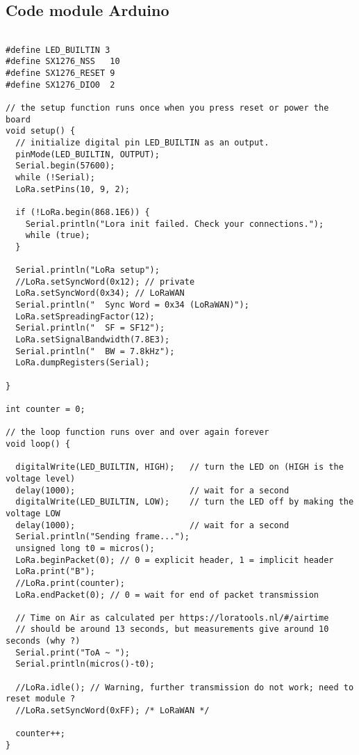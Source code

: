 \renewcommand{\leftmark}{ANNEXES}

\chapter{}

\section{Code module Arduino}\label{codearduino}

\begin{lstlisting}[style=cppstyle, caption={Module Arduino}, label={lst:cpp}]

#define LED_BUILTIN 3
#define SX1276_NSS   10
#define SX1276_RESET 9
#define SX1276_DIO0  2

// the setup function runs once when you press reset or power the board
void setup() {
  // initialize digital pin LED_BUILTIN as an output.
  pinMode(LED_BUILTIN, OUTPUT);
  Serial.begin(57600);
  while (!Serial);
  LoRa.setPins(10, 9, 2);

  if (!LoRa.begin(868.1E6)) {
    Serial.println("Lora init failed. Check your connections.");
    while (true);
  }

  Serial.println("LoRa setup");
  //LoRa.setSyncWord(0x12); // private
  LoRa.setSyncWord(0x34); // LoRaWAN
  Serial.println("  Sync Word = 0x34 (LoRaWAN)");
  LoRa.setSpreadingFactor(12);
  Serial.println("  SF = SF12");
  LoRa.setSignalBandwidth(7.8E3);
  Serial.println("  BW = 7.8kHz");
  LoRa.dumpRegisters(Serial);

}

int counter = 0;

// the loop function runs over and over again forever
void loop() {

  digitalWrite(LED_BUILTIN, HIGH);   // turn the LED on (HIGH is the voltage level)
  delay(1000);                       // wait for a second
  digitalWrite(LED_BUILTIN, LOW);    // turn the LED off by making the voltage LOW
  delay(1000);                       // wait for a second
  Serial.println("Sending frame...");
  unsigned long t0 = micros();
  LoRa.beginPacket(0); // 0 = explicit header, 1 = implicit header
  LoRa.print("B");
  //LoRa.print(counter);
  LoRa.endPacket(0); // 0 = wait for end of packet transmission

  // Time on Air as calculated per https://loratools.nl/#/airtime
  // should be around 13 seconds, but measurements give around 10 seconds (why ?)
  Serial.print("ToA ~ ");
  Serial.println(micros()-t0);

  //LoRa.idle(); // Warning, further transmission do not work; need to reset module ?
  //LoRa.setSyncWord(0xFF); /* LoRaWAN */

  counter++;
}
\end{lstlisting}

